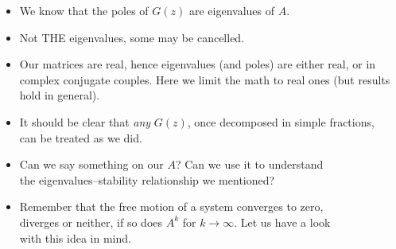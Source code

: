 \begin{frame}
\myPause
 \begin{itemize}[<+-| alert@+>]
 \item We know that the poles of $G(z)$ are eigenvalues of $A$.
 \item Not THE eigenvalues, some may be cancelled.
 \item Our matrices are real, hence eigenvalues (and poles) are either real, or in complex
       conjugate couples. Here we limit the math to real ones (but results hold in general).
 \item \vfill It should be clear that \emph{any} $G(z)$, once decomposed in simple fractions,\\
       can be treated as we did.
 \item Can we say something on our $A$? Can we use it to understand\\
       the eigenvalues--stability relationship we mentioned? 
 \item Remember that the free motion of a system converges to zero,\\
       diverges or neither, if so  does $A^k$ for $k\rightarrow\infty$. Let us have a look\\
       with this idea in mind.
 \end{itemize}
\end{frame}

